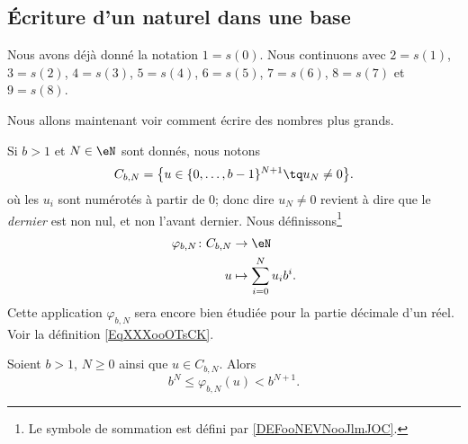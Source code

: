 \subsection{Écriture d'un naturel dans une base}

\begin{normaltext}
    Nous avons déjà donné la notation \( 1=s(0)\). Nous continuons avec \( 2=s(1)\), \( 3=s(2)\), \( 4=s(3)\), \( 5=s(4)\), \( 6=s(5)\), \( 7=s(6)\), \( 8=s(7)\) et \( 9=s(8)\).

    Nous allons maintenant voir comment écrire des nombres plus grands.
\end{normaltext}

Si \( b>1\) et \( N\in \eN\) sont donnés, nous notons
\begin{equation}
    C_{b,N}=\big\{  u\in \{ 0,\ldots, b-1 \}^{N+1}\tq u_N\neq 0  \big\}.
\end{equation}
où les \( u_i\) sont numérotés à partir de \( 0\); donc dire \( u_N\neq 0\) revient à dire que le \emph{dernier} est non nul, et non l'avant dernier. Nous définissons\footnote{Le symbole de sommation est défini par \ref{DEFooNEVNooJlmJOC}.}
\begin{equation}        \label{EQooWWTUooHAnSEv}
    \begin{aligned}
        \varphi_{b,N}\colon C_{b,N}&\to \eN \\
        u&\mapsto \sum_{i=0}^Nu_ib^i.
    \end{aligned}
\end{equation}
Cette application \( \varphi_{b,N}\) sera encore bien étudiée pour la partie décimale d'un réel. Voir la définition \ref{EqXXXooOTsCK}.

\begin{lemma}       \label{LEMooJUGKooGsbrhi}
    Soient \( b>1\), \( N\geq 0\) ainsi que \( u\in C_{b,N}\). Alors
    \begin{equation}        \label{EQooYHTLooNwqIIq}
        b^N\leq \varphi_{b,N}(u)<b^{N+1}.
    \end{equation}
\end{lemma}

